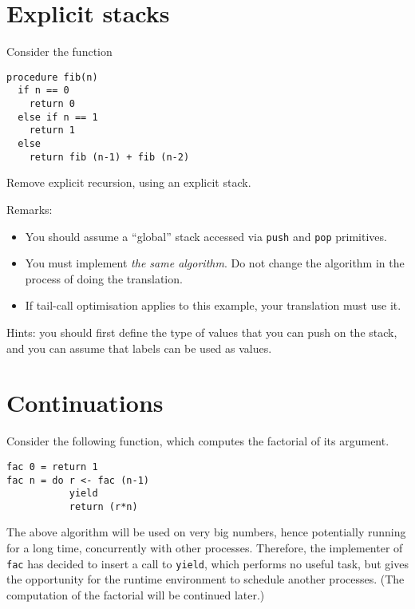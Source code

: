 \documentclass[7pt]{article}
\begin{document}
\newcommand{\examtime}{14:00, March 9th, 2012}
\newcommand{\points}[1]{\marginpar{\bf #1 points}}


\section{Explicit stacks}

Consider the function
\begin{verbatim}
procedure fib(n)
  if n == 0
    return 0
  else if n == 1
    return 1
  else 
    return fib (n-1) + fib (n-2)
\end{verbatim}

Remove explicit recursion, using an explicit stack. 

Remarks:

\begin{itemize}
\item  You should assume a ``global'' stack accessed via \texttt{push}
  and \texttt{pop} primitives.

\item You must implement \emph{the same algorithm}. Do not change
  the algorithm in the process of doing the translation.

\item If tail-call optimisation applies to this example, your
  translation must use it.
\end{itemize}

Hints: you should first define the type of values that you can push on
the stack, and you can assume that labels can be used as values.

\section{Continuations}

Consider the following function, which computes the factorial of its argument.
\begin{verbatim}
fac 0 = return 1
fac n = do r <- fac (n-1)
           yield
           return (r*n)
\end{verbatim}

The above algorithm will be used on very big numbers, hence
potentially running for a long time, concurrently with other
processes. Therefore, the implementer of \texttt{fac} has decided
to insert a call to \texttt{yield}, which performs no useful task, but
gives the opportunity for the runtime environment to schedule another
processes. (The computation of the factorial will be continued
later.)
\end{document}
